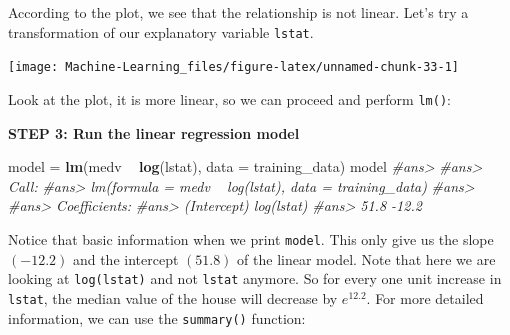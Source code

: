 \documentclass[]{book}
\newenvironment{Shaded}{\begin{snugshade}}{\end{snugshade}}
\newcommand{\KeywordTok}[1]{\textcolor[rgb]{0.13,0.29,0.53}{\textbf{#1}}}
\newcommand{\DataTypeTok}[1]{\textcolor[rgb]{0.13,0.29,0.53}{#1}}
\newcommand{\StringTok}[1]{\textcolor[rgb]{0.31,0.60,0.02}{#1}}
\newcommand{\CommentTok}[1]{\textcolor[rgb]{0.56,0.35,0.01}{\textit{#1}}}
\newcommand{\OperatorTok}[1]{\textcolor[rgb]{0.81,0.36,0.00}{\textbf{#1}}}
\newcommand{\NormalTok}[1]{#1}
\theoremstyle{definition}
\theoremstyle{definition}
\theoremstyle{definition}
\theoremstyle{remark}
\begin{document}
According to the plot, we see that the relationship is not linear. Let's
try a transformation of our explanatory variable \texttt{lstat}.

\begin{Shaded}
\end{Shaded}

\begin{center}\texttt{[image: Machine-Learning\_files/figure-latex/unnamed-chunk-33-1]} \end{center}

Look at the plot, it is more linear, so we can proceed and perform
\texttt{lm()}:

\textbf{STEP 3: Run the linear regression model}

\begin{Shaded}
\begin{Highlighting}[]
\NormalTok{model =}\StringTok{ }\KeywordTok{lm}\NormalTok{(medv }\OperatorTok{~}\StringTok{ }\KeywordTok{log}\NormalTok{(lstat), }\DataTypeTok{data =}\NormalTok{ training_data)}
\NormalTok{model}
\CommentTok{#ans> }
\CommentTok{#ans> Call:}
\CommentTok{#ans> lm(formula = medv ~ log(lstat), data = training_data)}
\CommentTok{#ans> }
\CommentTok{#ans> Coefficients:}
\CommentTok{#ans> (Intercept)   log(lstat)  }
\CommentTok{#ans>        51.8        -12.2}
\end{Highlighting}
\end{Shaded}

Notice that basic information when we print \texttt{model}. This only
give us the slope \((-12.2)\) and the intercept \((51.8)\) of the linear
model. Note that here we are looking at \texttt{log(lstat)} and not
\texttt{lstat} anymore. So for every one unit increase in
\texttt{lstat}, the median value of the house will decrease by
\(e^{12.2}\). For more detailed information, we can use the
\texttt{summary()} function:
\end{document}
